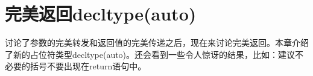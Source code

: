 \chapter{完美返回decltype(auto)}
讨论了参数的完美转发和返回值的完美传递之后，现在来讨论完美返回。本章介绍了新的占位符类型decltype(auto)。还会看到一些令人惊讶的结果，比如：建议不必要的括号不要出现在return语句中。


